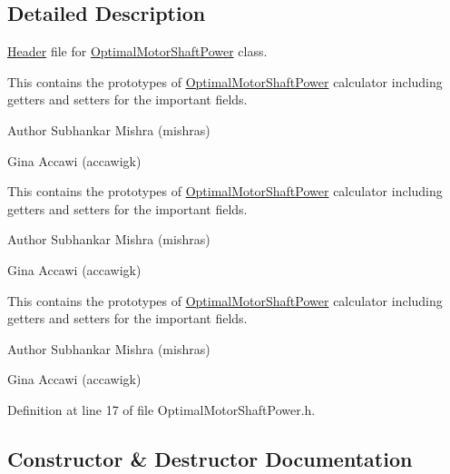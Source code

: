 \subsection{Detailed Description}
\hyperlink{class_header}{Header} file for \hyperlink{class_optimal_motor_shaft_power}{Optimal\+Motor\+Shaft\+Power} class. 

This contains the prototypes of \hyperlink{class_optimal_motor_shaft_power}{Optimal\+Motor\+Shaft\+Power} calculator including getters and setters for the important fields.

\begin{DoxyAuthor}{Author}
Subhankar Mishra (mishras) 

Gina Accawi (accawigk) 
\end{DoxyAuthor}


This contains the prototypes of \hyperlink{class_optimal_motor_shaft_power}{Optimal\+Motor\+Shaft\+Power} calculator including getters and setters for the important fields.

\begin{DoxyAuthor}{Author}
Subhankar Mishra (mishras) 

Gina Accawi (accawigk) 
\end{DoxyAuthor}


This contains the prototypes of \hyperlink{class_optimal_motor_shaft_power}{Optimal\+Motor\+Shaft\+Power} calculator including getters and setters for the important fields.

\begin{DoxyAuthor}{Author}
Subhankar Mishra (mishras) 

Gina Accawi (accawigk) 
\end{DoxyAuthor}


Definition at line 17 of file Optimal\+Motor\+Shaft\+Power.\+h.



\subsection{Constructor \& Destructor Documentation}
\mbox{\label{class_optimal_motor_shaft_power_ad830e1f8a7931e3c6bec5f8828d57e83}} 
